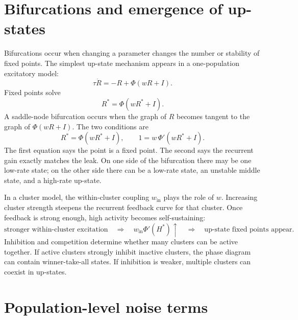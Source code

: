 \section{Bifurcations and emergence of up-states}
\label{sec:bifurcations-emergence-up-states}

Bifurcations occur when changing a parameter changes the number or stability of fixed points. The simplest up-state mechanism appears in a one-population excitatory model:
%
\begin{equation}
  \tau \dot R
  =
  -R+\Phi(wR+I).
  \label{eq:one-pop-upstate-model}
\end{equation}
%
Fixed points solve
%
\begin{equation}
  R^*=\Phi(wR^*+I).
  \label{eq:one-pop-fixed-point}
\end{equation}
%
A saddle-node bifurcation occurs when the graph of $R$ becomes tangent to the graph of $\Phi(wR+I)$. The two conditions are
%
\begin{equation}
  R^*=\Phi(wR^*+I),
  \qquad
  1=w\,\Phi'(wR^*+I).
  \label{eq:saddle-node-conditions}
\end{equation}
%
The first equation says the point is a fixed point. The second says the recurrent gain exactly matches the leak. On one side of the bifurcation there may be one low-rate state; on the other side there can be a low-rate state, an unstable middle state, and a high-rate up-state.

In a cluster model, the within-cluster coupling $w_{\mathrm{in}}$ plays the role of $w$. Increasing cluster strength steepens the recurrent feedback curve for that cluster. Once feedback is strong enough, high activity becomes self-sustaining:
%
\begin{equation}
  \text{stronger within-cluster excitation}
  \quad\Rightarrow\quad
  w_{\mathrm{in}}\Phi'(H^*) \uparrow
  \quad\Rightarrow\quad
  \text{up-state fixed points appear}.
  \label{eq:cluster-strength-upstates}
\end{equation}
%
Inhibition and competition determine whether many clusters can be active together. If active clusters strongly inhibit inactive clusters, the phase diagram can contain winner-take-all states. If inhibition is weaker, multiple clusters can coexist in up-states.

\section{Population-level noise terms}
\label{sec:population-level-noise-terms}

